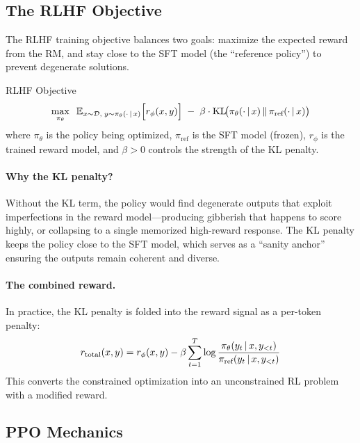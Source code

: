 \subsection{The RLHF Objective}

The RLHF training objective balances two goals: maximize the expected reward
from the RM, and stay close to the SFT model (the ``reference policy'') to
prevent degenerate solutions.

\begin{mathresult}{RLHF Objective}
\begin{equation}
\max_{\pi_\theta} \;\;
\operatorname{\mathbb{E}}_{x \sim \mathcal{D},\; y \sim \pi_\theta(\cdot \,|\, x)}
\Bigl[r_\phi(x, y)\Bigr]
\;-\; \beta \cdot \operatorname{KL}\!\bigl(\pi_\theta(\cdot \,|\, x) \,\|\, \pi_{\text{ref}}(\cdot \,|\, x)\bigr)
\label{eq:rlhf_objective}
\end{equation}
where $\pi_\theta$ is the policy being optimized, $\pi_{\text{ref}}$ is the
SFT model (frozen), $r_\phi$ is the trained reward model, and $\beta > 0$
controls the strength of the KL penalty.
\end{mathresult}

\paragraph{Why the KL penalty?}
Without the KL term, the policy would find degenerate outputs that exploit
imperfections in the reward model---producing gibberish that happens to
score highly, or collapsing to a single memorized high-reward response.
The KL penalty keeps the policy close to the SFT model, which serves as a
``sanity anchor'' ensuring the outputs remain coherent and diverse.

\paragraph{The combined reward.}
In practice, the KL penalty is folded into the reward signal as a per-token
penalty:
\begin{equation}
r_{\text{total}}(x, y)
= r_\phi(x, y)
  - \beta \sum_{t=1}^{T} \log \frac{\pi_\theta(y_t \,|\, x, y_{<t})}
                                     {\pi_{\text{ref}}(y_t \,|\, x, y_{<t})}
\label{eq:total_reward}
\end{equation}
This converts the constrained optimization into an unconstrained RL problem
with a modified reward.

\subsection{PPO Mechanics}

